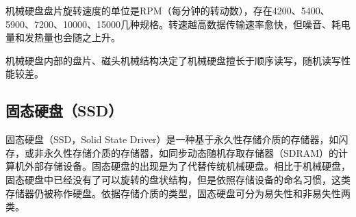 机械硬盘盘片旋转速度的单位是RPM（每分钟的转动数），存在4200、5400、5900、7200、10000、15000几种规格。转速越高数据传输速率愈快，但噪音、耗电量和发热量也会随之上升。

机械硬盘内部的盘片、磁头机械结构决定了机械硬盘擅长于顺序读写，随机读写性能较差。

\subsection{固态硬盘（SSD）}
固态硬盘\cite{ssd2009}（SSD，Solid State Driver）是一种基于永久性存储介质的存储器，如闪存，或非永久性存储介质的存储器，如同步动态随机存取存储器（SDRAM）的计算机外部存储设备。固态硬盘的出现是为了代替传统机械硬盘。相比于机械硬盘，固态硬盘中已经没有了可以旋转的盘状结构，但是依照存储设备的命名习惯，这类存储器仍被称作硬盘。依据存储介质的类型，固态硬盘可分为易失性和非易失性两类。

